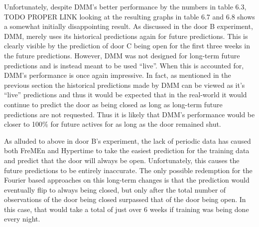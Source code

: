 Unfortunately, despite DMM's better performance by the numbers in table 6.3, TODO PROPER LINK
looking at the resulting graphs in table 6.7 and 6.8 shows a somewhat
initially disappointing result. As discussed in the door B experiment,
DMM, merely uses its historical predictions again for future
predictions. This is clearly visible by the prediction of door C being open
for the first three weeks in the future predictions. However, DMM was not
designed for long-term future predictions and is instead meant to be used
``live''. When this is accounted for, DMM's performance is once again
impressive. In fact, as mentioned in the previous section the
historical predictions made by DMM can be viewed as it's ``live''
predictions and thus it would be expected that in the real-world it would
continue to predict the door as being closed as long as long-term future
predictions are not requested. Thus it is likely that DMM's
performance would be closer to 100\% for future actives for as long as the door
remained shut. \\

\begin{table}[h!]
  \centering

  \caption{Door C Data Overview}
\end{table}

As alluded to above in door B's experiment, the lack of periodic data has
caused both FreMEn and Hypertime to take the easiest prediction for the
training data and predict that the door will always be open. Unfortunately,
this causes the future predictions to be entirely inaccurate. The only possible redemption
for the Fourier based approaches on this long-term changes is that the
prediction would eventually flip to always being closed, but only after the total number of observations of the door being
closed surpassed that of the door being open. In this case, that would take a
total of just over 6 weeks if training was being done every night. \\

